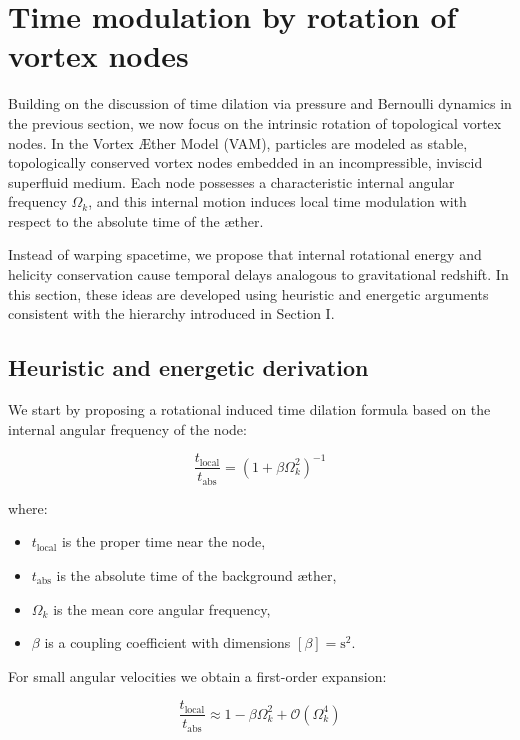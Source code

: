 \section{Time modulation by rotation of vortex nodes}

Building on the discussion of time dilation via pressure and Bernoulli dynamics in the previous section, we now focus on the intrinsic rotation of topological vortex nodes. In the Vortex Æther Model (VAM), particles are modeled as stable, topologically conserved vortex nodes embedded in an incompressible, inviscid superfluid medium. Each node possesses a characteristic internal angular frequency $\Omega_k$, and this internal motion induces local time modulation with respect to the absolute time of the æther.

Instead of warping spacetime, we propose that internal rotational energy and helicity conservation cause temporal delays analogous to gravitational redshift. In this section, these ideas are developed using heuristic and energetic arguments consistent with the hierarchy introduced in Section I.

\subsection{Heuristic and energetic derivation}

We start by proposing a rotational induced time dilation formula based on the internal angular frequency of the node:

\begin{equation}
    \frac{t_\text{local}}{t_\text{abs}} = \left(1 + \beta \Omega_k^2 \right)^{-1}\label{eq:rotational_induced_time_dilation}
\end{equation}

where:

\begin{itemize}
    \item $t_\text{local}$ is the proper time near the node,
    \item $t_\text{abs}$ is the absolute time of the background æther,
    \item $\Omega_k$ is the mean core angular frequency,
    \item $\beta$ is a coupling coefficient with dimensions $[\beta] = \text{s}^2$.
\end{itemize}

For small angular velocities we obtain a first-order expansion:

\begin{equation}
    \frac{t_\text{local}}{t_\text{abs}} \approx 1 - \beta \Omega_k^2 + \mathcal{O}(\Omega_k^4)\label{eq:rotational_induced_time_dilation_expansion}
\end{equation}

